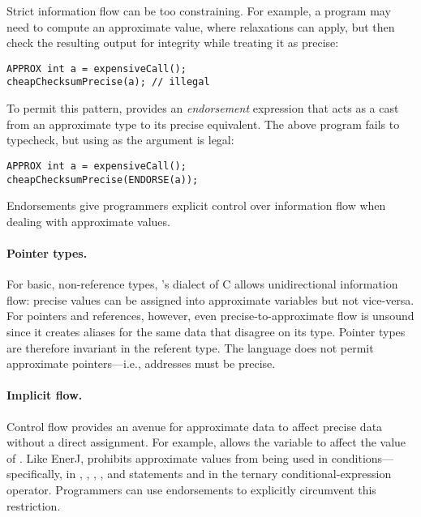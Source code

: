 Strict information flow can be too constraining.
For example, a program may need to
compute an approximate value, where relaxations can apply, but then check the
resulting output for integrity while treating it as precise:
%
\begin{lstlisting}
APPROX int a = expensiveCall();
cheapChecksumPrecise(a); // illegal
\end{lstlisting}
%
To permit this pattern, \sysname provides an \emph{endorsement} expression
that acts as a cast from an approximate type to its precise equivalent.
The above program fails to typecheck, but using  as the argument
is legal:
\begin{lstlisting}
APPROX int a = expensiveCall();
cheapChecksumPrecise(ENDORSE(a));
\end{lstlisting}
Endorsements give programmers explicit control over information flow
when dealing with approximate values.

\paragraph{Pointer types.}
For basic, non-reference types, \sysname's dialect of C allows unidirectional
information flow: precise values can be assigned into approximate variables
but not vice-versa. For pointers and references, however,
even precise-to-approximate flow is unsound since
it creates aliases for the same data that disagree on its type.
Pointer types are therefore invariant in the referent type.
The language does not permit approximate pointers---i.e., addresses must be
precise.

\paragraph{Implicit flow.}
Control flow provides an avenue for approximate data to affect precise data
without a direct assignment. For example,  allows the
variable  to affect the value of .
Like EnerJ, \sysname prohibits approximate values from being used in
conditions---specifically, in , , , , and
 statements and in the ternary conditional-expression operator.
Programmers can use endorsements to explicitly circumvent this restriction.

